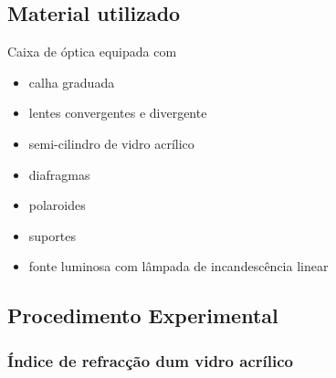 \documentclass[a4paper,12pt]{article}      %
\begin{document}

\subsection{\sf Material utilizado}
Caixa de óptica equipada com
\begin{itemize}
\item calha graduada
\item lentes convergentes e divergente
\item semi-cilindro de vidro acrílico
\item diafragmas
\item polaroides
\item suportes
\item fonte luminosa com lâmpada de incandescência linear
\end{itemize}


\subsection{\sf Procedimento Experimental}

\subsubsection{\sf  Índice de refracção dum vidro acrílico }
\end{document}
